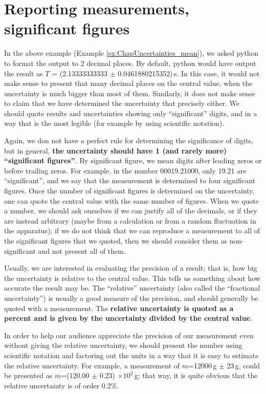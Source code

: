\section{Reporting measurements, significant figures}
In the above example (Example \ref{ex:ChapUncertainties_mean}), we asked python to format the output to 2 decimal places. By default, python would have output the result as $T$ = (2.13333333333 $\pm$ 0.0461880215352)\,s. In this case, it would not make sense to present that many decimal places on the central value, when the uncertainty is much bigger than most of them. Similarly, it does not make sense to claim that we have determined the uncertainty that precisely either. We should quote results and uncertainties showing only ``significant'' digits, and in a way that is the most legible (for example by using scientific notation).

Again, we don not have a perfect rule for determining the significance of digits, but in general, \textbf{the uncertainty should have 1 (and rarely more) ``significant figures''}. By significant figure, we mean digits after leading zeros or before trailing zeros. For example, in the number 00019.21000, only 19.21 are ``significant'', and we say that the measurement is determined to four significant figures. Once the number of significant figures is determined on the uncertainty, one can quote the central value with the same number of figures. When we quote a number, we should ask ourselves if we can justify all of the decimals, or if they are instead arbitrary (maybe from a calculation or from a random fluctuation in the apparatus); if we do not think that we can reproduce a measurement to all of the significant figures that we quoted, then we should consider them as non-significant and not present all of them.

Usually, we are interested in evaluating the precision of a result; that is, how big the uncertainty is relative to the central value. This tells us something about how accurate the result may be.  The ``relative'' uncertainty (also called the ``fractional uncertainty'') is usually a good measure of the precision, and should generally be quoted with a measurement. The \textbf{relative uncertainty is quoted as a percent and is given by the uncertainty divided by the central value}.

In order to help our audience appreciate the precision of our measurement even without giving the relative uncertainty, we should present the number using scientific notation and factoring out the units in a way that it is easy to estimate the relative uncertainty. For example, a measurement of $m$=12000\,g $\pm$ 23\,g, could be presented as $m$=(120.00 $\pm$ 0.23) $\times 10^2$\,g; that way, it is quite obvious that the relative uncertainty is of order 0.2\%.


